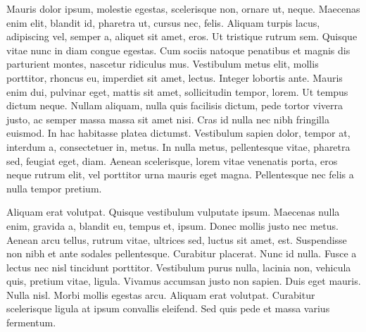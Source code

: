 \documentclass[12pt]{article}
\begin{document}
Mauris dolor ipsum, molestie egestas, scelerisque non, ornare ut, neque. Maecenas enim elit, blandit id, pharetra ut, cursus nec, felis. Aliquam turpis lacus, adipiscing vel, semper a, aliquet sit amet, eros. Ut tristique rutrum sem. Quisque vitae nunc in diam congue egestas. Cum sociis natoque penatibus et magnis dis parturient montes, nascetur ridiculus mus. Vestibulum metus elit, mollis porttitor, rhoncus eu, imperdiet sit amet, lectus. Integer lobortis ante. Mauris enim dui, pulvinar eget, mattis sit amet, sollicitudin tempor, lorem. Ut tempus dictum neque. Nullam aliquam, nulla quis facilisis dictum, pede tortor viverra justo, ac semper massa massa sit amet nisi. Cras id nulla nec nibh fringilla euismod. In hac habitasse platea dictumst. Vestibulum sapien dolor, tempor at, interdum a, consectetuer in, metus. In nulla metus, pellentesque vitae, pharetra sed, feugiat eget, diam. Aenean scelerisque, lorem vitae venenatis porta, eros neque rutrum elit, vel porttitor urna mauris eget magna. Pellentesque nec felis a nulla tempor pretium.

Aliquam erat volutpat. Quisque vestibulum vulputate ipsum. Maecenas nulla enim, gravida a, blandit eu, tempus et, ipsum. Donec mollis justo nec metus. Aenean arcu tellus, rutrum vitae, ultrices sed, luctus sit amet, est. Suspendisse non nibh et ante sodales pellentesque. Curabitur placerat. Nunc id nulla. Fusce a lectus nec nisl tincidunt porttitor. Vestibulum purus nulla, lacinia non, vehicula quis, pretium vitae, ligula. Vivamus accumsan justo non sapien. Duis eget mauris. Nulla nisl. Morbi mollis egestas arcu. Aliquam erat volutpat. Curabitur scelerisque ligula at ipsum convallis eleifend. Sed quis pede et massa varius fermentum.
\end{document}
